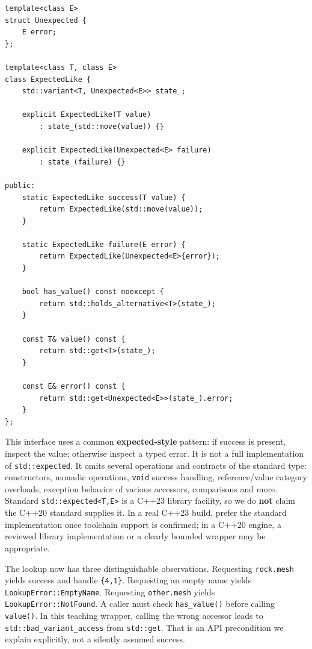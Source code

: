 \begin{verbatim}
template<class E>
struct Unexpected {
    E error;
};

template<class T, class E>
class ExpectedLike {
    std::variant<T, Unexpected<E>> state_;

    explicit ExpectedLike(T value)
        : state_(std::move(value)) {}

    explicit ExpectedLike(Unexpected<E> failure)
        : state_(failure) {}

public:
    static ExpectedLike success(T value) {
        return ExpectedLike(std::move(value));
    }

    static ExpectedLike failure(E error) {
        return ExpectedLike(Unexpected<E>{error});
    }

    bool has_value() const noexcept {
        return std::holds_alternative<T>(state_);
    }

    const T& value() const {
        return std::get<T>(state_);
    }

    const E& error() const {
        return std::get<Unexpected<E>>(state_).error;
    }
};
\end{verbatim}

This interface uses a common \textbf{expected-style} pattern: if success is present, inspect the value; otherwise inspect a typed error. It is not a full implementation of \texttt{std::expected}. It omits several operations and contracts of the standard type: constructors, monadic operations, \texttt{void} success handling, reference/value category overloads, exception behavior of various accessors, comparisons and more. Standard \texttt{std::expected\textless{}T,E\textgreater{}} is a C++23 library facility, so we do \textbf{not} claim the C++20 standard supplies it. In a real C++23 build, prefer the standard implementation once toolchain support is confirmed; in a C++20 engine, a reviewed library implementation or a clearly bounded wrapper may be appropriate.

The lookup now has three distinguishable observations. Requesting \texttt{rock.mesh} yields success and handle \texttt{\{4,1\}}. Requesting an empty name yields \texttt{LookupError::EmptyName}. Requesting \texttt{other.mesh} yields \texttt{LookupError::NotFound}. A caller must check \texttt{has\_value()} before calling \texttt{value()}. In this teaching wrapper, calling the wrong accessor leads to \texttt{std::bad\_variant\_access} from \texttt{std::get}. That is an API precondition we explain explicitly, not a silently assumed success.

